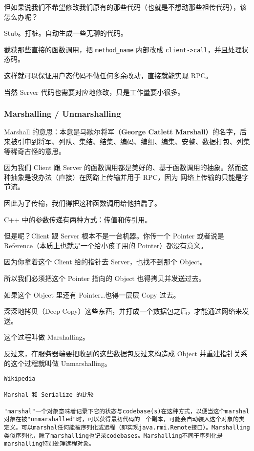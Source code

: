 \documentclass[
]{article}
\begin{document}
但如果说我们不希望修改我们原有的那些代码（也就是不想动那些祖传代码），该怎么办呢？

Stub。打桩。自动生成一些无聊的代码。

截获那些直接的函数调用，把 \texttt{method\_name} 内部改成
\texttt{client-\textgreater{}call}，并且处理状态码。

这样就可以保证用户态代码不做任何多余改动，直接就能实现 RPC。

当然 Server 代码也需要对应地修改，只是工作量要小很多。

\hypertarget{header-n24}{%
\subsubsection{Marshalling / Unmarshalling}\label{header-n24}}

Marshall 的意思：本意是马歇尔将军（\textbf{George Catlett
Marshall}）的名字，后来被引申到将军、列队、集结、结集、编码、编组、编集、安整、数据打包、列集等稀奇古怪的意思。

因为我们 Client 跟 Server
的函数调用都是美好的、基于函数调用的抽象。然而这种抽象是没办法（直接）在网路上传输并用于
RPC，因为 网络上传输的只能是字节流。

因此为了传输，我们得把这种函数调用给他拍扁了。

C++ 中的参数传递有两种方式：传值和传引用。

但是呢？Client 跟 Server 根本不是一台机器。你传一个 Pointer 或者说是
Reference（本质上也就是一个给小孩子用的 Pointer）都没有意义。

因为你拿着这个 Client 给的指针去 Server，也找不到那个 Object。

所以我们必须把这个 Pointer 指向的 Object 也得拷贝并发送过去。

如果这个 Object 里还有 Pointer\ldots 也得一层层 Copy 过去。

深深地拷贝（Deep
Copy）这些东西，并打成一个数据包之后，才能通过网络来发送。

这个过程叫做 Marshalling。

反过来，在服务器端要把收到的这些数据包反过来构造成 Object
并重建指针关系的这个过程就叫做 Unmarshalling。

\begin{verbatim}
Wikipedia

Marshal 和 Serialize 的比较

"marshal"一个对象意味着记录下它的状态与codebase(s)在这种方式，以便当这个marshal对象在被"unmarshalled"时，可以获得最初代码的一个副本，可能会自动装入这个对象的类定义。可以marshal任何能被序列化或远程（即实现java.rmi.Remote接口）。Marshalling类似序列化，除了marshalling也记录codebases。Marshalling不同于序列化是marshalling特别处理远程对象。
\end{verbatim}
\end{document}
